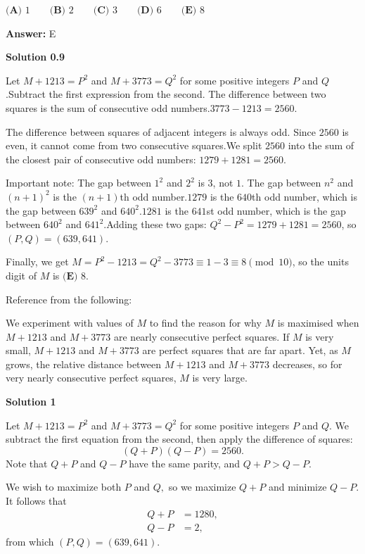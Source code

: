 \begin{enumerate}
 $\textbf{(A) }1 \qquad \textbf{(B) }2 \qquad \textbf{(C) }3 \qquad \textbf{(D) }6 \qquad \textbf{(E) }8 \qquad$

 \textbf{Answer: }E



\textbf{Solution 0.9}

Let $M+1213=P^2$ and $M+3773=Q^2$ for some positive integers $P$ and $Q$.Subtract the first expression from the second. The difference between two squares is the sum of consecutive odd numbers.$3773 - 1213 = 2560$.

 The difference between squares of adjacent integers is always odd. Since $2560$ is even, it cannot come from two consecutive squares.We split $2560$ into the sum of the closest pair of consecutive odd numbers: $1279 + 1281 = 2560$.

 Important note: The gap between $1^2$ and $2^2$ is $3$, not $1$. The gap between $n^2$ and $(n+1)^2$ is the $(n+1)$th odd number.$1279$ is the $640$th odd number, which is the gap between $639^2$ and $640^2$.$1281$ is the $641$st odd number, which is the gap between $640^2$ and $641^2$.Adding these two gaps: $Q^2-P^2 = 1279+1281=2560$, so $(P,Q)=(639,641)$.

 Finally, we get $M=P^2-1213=Q^2-3773\equiv 1-3\equiv 8\pmod{10}$, so the units digit of $M$ is $\boxed{\textbf{(E) }8}$.

 Reference from the following:

 We experiment with values of $M$ to find the reason for why $M$ is maximised when $M + 1213$ and $M + 3773$ are nearly consecutive perfect squares. If $M$ is very small, $M + 1213$ and $M + 3773$ are perfect squares that are far apart. Yet, as $M$ grows, the relative distance between $M + 1213$ and $M + 3773$ decreases, so for very nearly consecutive perfect squares, $M$ is very large.

 



\textbf{Solution 1}

Let $M+1213=P^2$ and $M+3773=Q^2$ for some positive integers $P$ and $Q.$ We subtract the first equation from the second, then apply the difference of squares: 
 \[(Q+P)(Q-P)=2560.\] Note that $Q+P$ and $Q-P$ have the same parity, and $Q+P>Q-P.$ 

 We wish to maximize both $P$ and $Q,$ so we maximize $Q+P$ and minimize $Q-P.$ It follows that
 \begin{align*} Q+P&=1280, \\ Q-P&=2, \end{align*}
from which $(P,Q)=(639,641).$


\end{enumerate}
